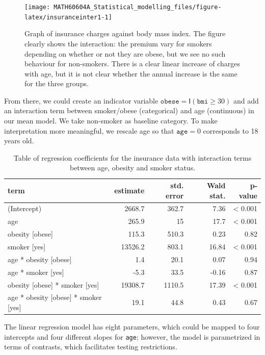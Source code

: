 \documentclass[
  11pt,
  letterpaper,
]{book}
\theoremstyle{definition}
\theoremstyle{definition}
\theoremstyle{definition}
\theoremstyle{remark}
\begin{document}
\begin{figure}

{\centering \texttt{[image: MATH60604A\_Statistical\_modelling\_files/figure-latex/insuranceinter1-1]} 

}

\caption{Graph of insurance charges against body mass index. The figure clearly shows the interaction: the premium vary for smokers depending on whether or not they are obese, but we see no such behaviour for non-smokers. There is a clear linear increase of charges with age, but it is not clear whether the annual increase is the same for the three groups.}\label{fig:insuranceinter1}
\end{figure}

From there, we could create an indicator variable \(\texttt{obese}=\mathsf{I}(\texttt{bmi} \geq 30)\) and add an interaction term between smoker/obese (categorical) and age (continuous) in our mean model. We take non-smoker as baseline category. To make interpretation more meaningful, we rescale age so that \(\texttt{age}=0\) corresponds to 18 years old.

\begin{table}

\caption{\label{tab:coefintercharges}Table of regression coefficients for the insurance data with interaction terms between age, obesity and smoker status.}
\centering
\begin{tabular}[t]{lrrrr}
\toprule
term & estimate & std. error & Wald stat. & p-value\\
\midrule
(Intercept) & 2668.7 & 362.7 & 7.36 & < 0.001\\
age & 265.9 & 15 & 17.7 & < 0.001\\
obesity [obese] & 115.3 & 510.3 & 0.23 & 0.82\\
smoker [yes] & 13526.2 & 803.1 & 16.84 & < 0.001\\
age * obesity [obese] & 1.4 & 20.1 & 0.07 & 0.94\\
\addlinespace
age * smoker [yes] & -5.3 & 33.5 & -0.16 & 0.87\\
obesity [obese] * smoker [yes] & 19308.7 & 1110.5 & 17.39 & < 0.001\\
age * obesity [obese] * smoker [yes] & 19.1 & 44.8 & 0.43 & 0.67\\
\bottomrule
\end{tabular}
\end{table}

The linear regression model has eight parameters, which could be mapped to four intercepts and four different slopes for \texttt{age}; however, the model is parametrized in terms of contrasts, which facilitates testing restrictions.
\end{document}

